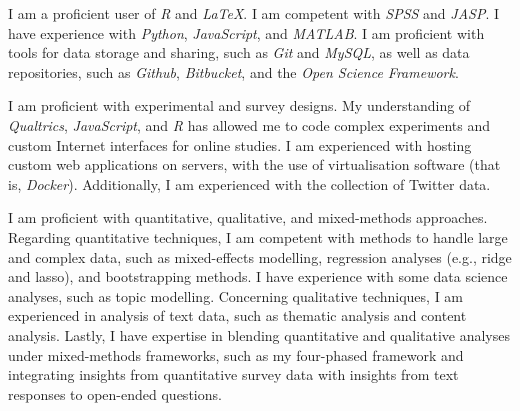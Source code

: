

\begin{small} \color{black}


I am a proficient user of \textit{R} and \textit{\LaTeX}. I am competent with \textit{SPSS} and \textit{JASP}. I have experience with \textit{Python}, \textit{JavaScript}, and \textit{MATLAB}. I am proficient with tools for data storage and sharing, such as \textit{Git} and \textit{MySQL}, as well as data repositories, such as \textit{Github}, \textit{Bitbucket}, and the \textit{Open Science Framework}.

I am proficient with experimental and survey designs. My understanding of \textit{Qualtrics}, \textit{JavaScript}, and \textit{R} has allowed me to code complex experiments and custom Internet interfaces for online studies. I am experienced with hosting custom web applications on servers, with the use of virtualisation software (that is, \textit{Docker}). Additionally, I am experienced with the collection of Twitter data.

I am proficient with quantitative, qualitative, and mixed-methods approaches. Regarding quantitative techniques, I am competent with methods to handle large and complex data, such as mixed-effects modelling, regression analyses (e.g., ridge and lasso), and bootstrapping methods. I have experience with some data science analyses, such as topic modelling. Concerning qualitative techniques, I am experienced in analysis of text data, such as thematic analysis and content analysis. Lastly, I have expertise in blending quantitative and qualitative analyses under mixed-methods frameworks, such as my four-phased framework \parencite{andreotta2019} and integrating insights from quantitative survey data with insights from text responses to open-ended questions.


\printbibliography[heading=none]

\end{small}

